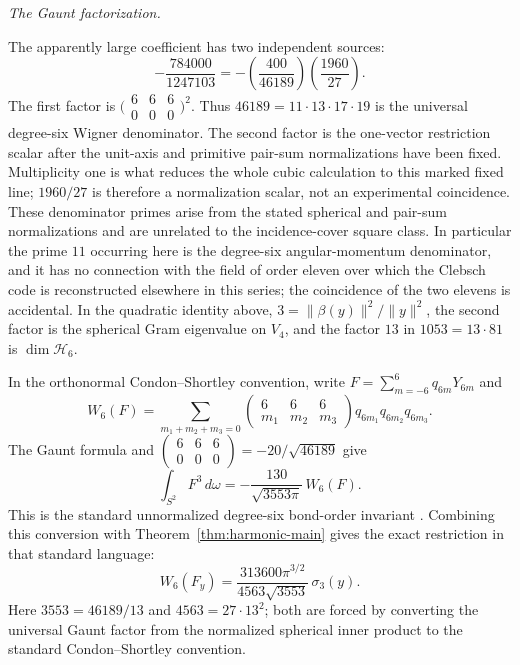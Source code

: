\smallskip
\noindent\emph{The Gaunt factorization.}\par
The apparently large coefficient has two independent sources:
\[
 -\frac{784000}{1247103}
 =-\left(\frac{400}{46189}\right)
    \left(\frac{1960}{27}\right).
\]
The first factor is
\(\bigl(\begin{smallmatrix}6&6&6\\0&0&0\end{smallmatrix}\bigr)^2\).
Thus \(46189=11\cdot13\cdot17\cdot19\) is the universal degree-six
Wigner denominator.  The second factor is the one-vector restriction scalar
after the unit-axis and primitive pair-sum normalizations have been fixed.
Multiplicity one is what reduces the whole cubic calculation to this marked
fixed line; \(1960/27\) is therefore a normalization scalar, not an
experimental coincidence.  These denominator primes arise from the stated
spherical and pair-sum normalizations and are unrelated to the
incidence-cover square class.  In particular the prime \(11\) occurring here is
the degree-six angular-momentum denominator, and it has no connection with the
field of order eleven over which the Clebsch code is reconstructed elsewhere in
this series; the coincidence of the two elevens is accidental.  In the quadratic identity above,
\(3=\|\beta(y)\|^2/\|y\|^2\), the second factor is the spherical Gram
eigenvalue on \(V_4\), and the factor \(13\) in \(1053=13\cdot81\) is
\(\dim\mathcal H_6\).

\begin{remark}
In the orthonormal Condon--Shortley convention, write
\(F=\sum_{m=-6}^6q_{6m}Y_{6m}\) and
\[
 W_6(F)=
 \sum_{m_1+m_2+m_3=0}
 \begin{pmatrix}6&6&6\\m_1&m_2&m_3\end{pmatrix}
 q_{6m_1}q_{6m_2}q_{6m_3}.
\]
The Gaunt formula and
\(\left(\begin{smallmatrix}6&6&6\\0&0&0\end{smallmatrix}\right)
=-20/\sqrt{46189}\) give
\[
 \int_{S^2}F^3\,d\omega
 =-\frac{130}{\sqrt{3553\pi}}\,W_6(F).
\]
This is the standard unnormalized degree-six bond-order invariant
\cite{SNR1981,SNR1983,DLMF}.
Combining this conversion with Theorem~\ref{thm:harmonic-main} gives the
exact restriction in that standard language:
\[
 W_6(F_y)
 =\frac{313600\pi^{3/2}}{4563\sqrt{3553}}\,\sigma_3(y).
\]
Here \(3553=46189/13\) and \(4563=27\cdot13^2\); both are forced by
converting the universal Gaunt factor from the normalized spherical inner
product to the standard Condon--Shortley convention.
\end{remark}
